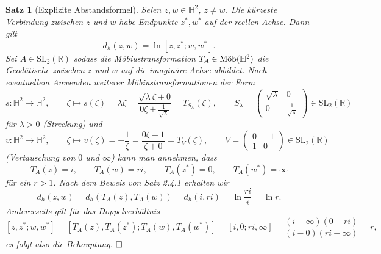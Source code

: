 \documentclass[11pt]{book}
\numberwithin{dummy}{section}
\newtheorem{theorem}{Satz}[section]
\theoremstyle{nonumberbreak}
\newenvironment{pr}[1][]{\ifthenelse{\equal{#1}{}}{\proof}{\proof[#1]}\rm}{\endproof}
\newcommand{\R}{\mathbb{R}}
\newcommand{\He}{\mathbb{H}}
\newcommand{\la}{\longrightarrow}
\newcommand{\amob}{\textup{Möb}}
\begin{document}
\begin{spacing}{1.4}
\begin{theorem}[Explizite Abstandsformel]     %
Seien $z,w \in \He^2$, $z\neq w$. Die kürzeste Verbindung zwischen $z$ und $w$ habe Endpunkte $z^{*}, w^{*}$ auf der reellen Achse. Dann gilt
$$d_h(z,w) = \ln [z,z^*;w,w^*].$$
\begin{pr}
Sei $A \in \mathrm{SL}_2(\R)$ sodass die Möbiustransformation $T_A \in \amob(\He^2)$ die Geodätische zwischen $z$ und $w$ auf die imaginäre Achse abbildet. Nach eventuellem Anwenden weiterer Möbiustransformationen der Form
$$s: \He^2 \la \He^2, \qquad \zeta \mapsto s(\zeta) = \lambda \zeta = \frac{\sqrt{\lambda}\zeta + 0}{0\zeta + \frac{1}{\sqrt{\lambda}}} = T_{S_{\lambda}}(\zeta), \qquad S_{\lambda} = \begin{pmatrix} \sqrt{\lambda} & 0 \\[-2pt] 0 & \frac{1}{\sqrt{\lambda}}\end{pmatrix}\in \mathrm{SL}_2(\R)$$
für $\lambda>0$ (Streckung) und 
$$v: \He^2 \la \He^2, \qquad \zeta \mapsto v(\zeta) = -\frac{1}{\zeta} = \frac{0\zeta -1}{\zeta+0} = T_V(\zeta), \qquad V=\begin{pmatrix}0 & -1\\[-2pt] 1 & 0 \end{pmatrix} \in \mathrm{SL}_2(\R)$$
(Vertauschung von $0$ und $\infty$) kann man annehmen, dass 
$$T_A(z) = i, \qquad T_A(w) = ri, \qquad T_A(z^*)= 0, \qquad T_A(w^*) = \infty$$
für ein $r>1$. Nach dem Beweis von Satz 2.4.1 erhalten wir 
$$d_h(z,w) = d_h(T_A(z), T_A(w)) = d_h(i, ri) = \ln \frac{ri}{i} = \ln r.$$
Andererseits gilt für das Doppelverhältnis
$$[z,z^*;w,w^*] = [T_A(z), T_A(z^*); T_A(w), T_A(w^*)] = [i,0;ri,\infty] = \frac{(i-\infty)(0-ri)}{(i-0)(ri-\infty)} = r,$$
es folgt also die Behauptung. $\hfill \Box$



\end{pr}
\end{theorem}



\end{spacing}
\end{document}
